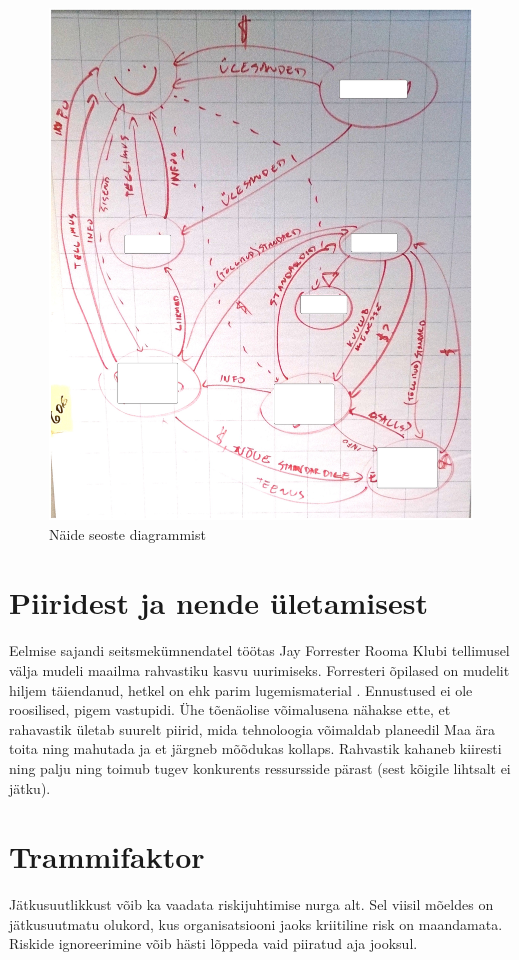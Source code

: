 \begin{figure}[h]
	\begin{center}
		\includegraphics[width=.6\textwidth]{seosed.jpg}
		\caption{Näide seoste diagrammist}
		\label{fig:seosed}
	\end{center}
\end{figure}




\section{Piiridest ja nende ületamisest}
Eelmise sajandi seitsmekümnendatel töötas Jay Forrester Rooma Klubi tellimusel välja mudeli maailma rahvastiku kasvu uurimiseks. Forresteri õpilased on mudelit hiljem täiendanud, hetkel on ehk parim lugemismaterial \cite{meadows1992beyond}. Ennustused ei ole roosilised, pigem vastupidi. Ühe tõenäolise võimalusena nähakse ette, et rahavastik ületab suurelt piirid, mida tehnoloogia võimaldab planeedil Maa ära toita ning mahutada ja et järgneb mõõdukas kollaps. Rahvastik kahaneb kiiresti ning palju ning toimub tugev konkurents ressursside pärast (sest kõigile lihtsalt ei jätku). 

\section{Trammifaktor}
Jätkusuutlikkust võib ka vaadata riskijuhtimise nurga alt. Sel viisil mõeldes on jätkusuutmatu olukord, kus organisatsiooni jaoks kriitiline risk on maandamata. Riskide ignoreerimine võib hästi lõppeda vaid piiratud aja jooksul.

